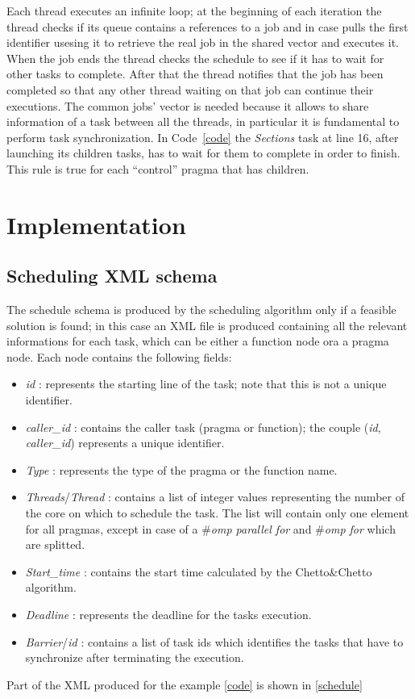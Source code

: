 \documentclass[a4paper,11pt,oneside]{book}
\begin{document}
Each thread executes an infinite loop; at the beginning of each iteration the thread checks if its queue contains a references to a job and in case pulls the first identifier usesing it to retrieve the real job in the shared vector and executes it. When the job ends the thread checks the schedule to see if it has to wait for other tasks to complete. After that the thread notifies that the job has been completed so that any other thread waiting on that job can continue their executions. The common jobs’ vector is needed because it allows to share information of a task between all the threads, in particular it is fundamental to perform task synchronization. In Code~\ref{code} the \emph{Sections} task at line 16, after launching its children tasks, has to wait for them to complete in order to finish. This rule is true for each “control” pragma that has children. 


\chapter{Implementation}
\section{Scheduling XML schema}
\label{schedulexmlschema}

The schedule schema is produced by the scheduling algorithm only if a feasible solution is found; in this case an XML file is produced containing all the relevant informations for each task, which can be either a function node ora a pragma node. Each node contains the following fields:
\begin{itemize}
\item{\emph{id} : represents the starting line of the task; note that this is not a unique identifier.}
\item{\emph{caller\_id} : contains the caller task (pragma or function); the couple (\emph{id}, \emph{caller\_id}) represents a unique identifier.}
\item{\emph{Type} : represents the type of the pragma or the function name. }
\item{\emph{Threads}/\emph{Thread} : contains a list of integer values representing the number of the core on which to schedule the task. The list will contain only one element for all pragmas, except in case of a \emph{$\#$omp parallel for} and \emph{$\#$omp for} which are splitted.}
\item{\emph{Start\_time} : contains the start time calculated by the Chetto\&Chetto algorithm.}
\item{\emph{Deadline} : represents the deadline for the tasks execution.}
\item{\emph{Barrier}/\emph{id} : contains a list of task ids which identifies the tasks that have to synchronize after terminating the execution.}
\end{itemize}
Part of the XML produced for the example \ref{code} is shown  in \ref{schedule}
\end{document}
